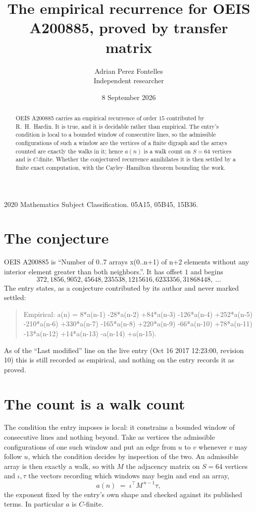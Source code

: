 \documentclass[11pt,a4paper]{article}
\title{The empirical recurrence for OEIS A200885, proved by transfer matrix}
\author{Adrian Perez Fontelles\\ \small Independent researcher}
\date{8 September 2026}
\theoremstyle{plain}
\theoremstyle{definition}
\begin{document}
\maketitle

\begin{abstract}
OEIS A200885 carries an empirical recurrence of order $15$ contributed by R.~H.~Hardin. It is
true, and it is decidable rather than empirical. The entry's condition is local to a bounded window of consecutive lines, so
the admissible configurations of such a window are the vertices of a finite digraph and the
arrays counted are exactly the walks in it; hence $a(n)$ is a walk count on $S=64$ vertices
and is $C$-finite. Whether the conjectured recurrence annihilates it is then settled by a
finite exact computation, with the Cayley--Hamilton theorem bounding the work.
\end{abstract}

\noindent\small 2020 Mathematics Subject Classification. 05A15, 05B45, 15B36.\normalsize

\section{The conjecture}

OEIS A200885 is ``Number of 0..7 arrays x(0..n+1) of n+2 elements without any interior element greater than both neighbors.''. It has offset $1$ and begins
\[
372, 1856, 9052, 45648, 235538, 1215616, 6233356, 31868448,\ \dots
\]
The entry states, as a conjecture contributed by its author and never marked settled:
\begin{quote}
Empirical: a(n) = 8*a(n-1) -28*a(n-2) +84*a(n-3) -126*a(n-4) +252*a(n-5) -210*a(n-6) +330*a(n-7) -165*a(n-8) +220*a(n-9) -66*a(n-10) +78*a(n-11) -13*a(n-12) +14*a(n-13) -a(n-14) +a(n-15).
\end{quote}
As of the ``Last modified'' line on the live entry (Oct 16 2017 12:23:00, revision 10) this is still
recorded as empirical, and nothing on the entry records it as proved.

\section{The count is a walk count}

The condition the entry imposes is local: it constrains a bounded window of consecutive lines and nothing beyond. Take as
vertices the admissible configurations of one such window and put an edge from $u$ to $v$
whenever $v$ may follow $u$, which the condition decides by inspection of the two. An
admissible array is then exactly a walk, so with $M$ the adjacency matrix on $S=64$ vertices
and $\iota,\tau$ the vectors recording which windows may begin and end an array,
\[
a(n)\;=\;\iota^{\!\top}M^{\,n-1}\tau ,
\]
the exponent fixed by the entry's own shape and checked against its published terms. In
particular $a$ is $C$-finite.
\end{document}
